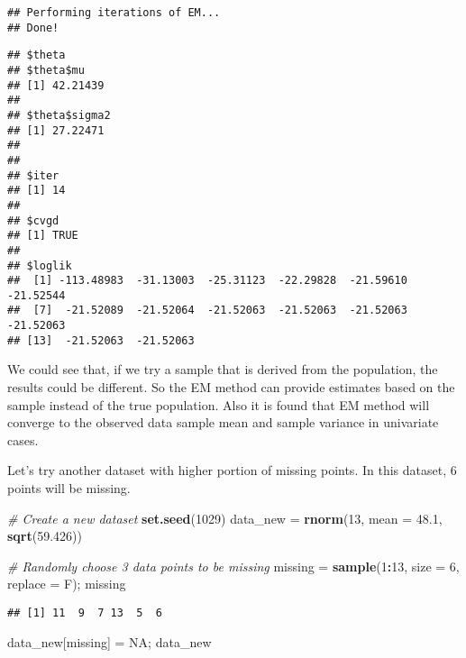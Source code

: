 \documentclass[]{article}
\newenvironment{Shaded}{\begin{snugshade}}{\end{snugshade}}
\newcommand{\CommentTok}[1]{\textcolor[rgb]{0.56,0.35,0.01}{\textit{#1}}}
\newcommand{\DataTypeTok}[1]{\textcolor[rgb]{0.13,0.29,0.53}{#1}}
\newcommand{\DecValTok}[1]{\textcolor[rgb]{0.00,0.00,0.81}{#1}}
\newcommand{\FloatTok}[1]{\textcolor[rgb]{0.00,0.00,0.81}{#1}}
\newcommand{\KeywordTok}[1]{\textcolor[rgb]{0.13,0.29,0.53}{\textbf{#1}}}
\newcommand{\NormalTok}[1]{#1}
\newcommand{\OperatorTok}[1]{\textcolor[rgb]{0.81,0.36,0.00}{\textbf{#1}}}
\newcommand{\OtherTok}[1]{\textcolor[rgb]{0.56,0.35,0.01}{#1}}
\newcommand{\StringTok}[1]{\textcolor[rgb]{0.31,0.60,0.02}{#1}}
\begin{document}
\begin{verbatim}
## Performing iterations of EM... 
## Done!
\end{verbatim}

\begin{verbatim}
## $theta
## $theta$mu
## [1] 42.21439
## 
## $theta$sigma2
## [1] 27.22471
## 
## 
## $iter
## [1] 14
## 
## $cvgd
## [1] TRUE
## 
## $loglik
##  [1] -113.48983  -31.13003  -25.31123  -22.29828  -21.59610  -21.52544
##  [7]  -21.52089  -21.52064  -21.52063  -21.52063  -21.52063  -21.52063
## [13]  -21.52063  -21.52063
\end{verbatim}

We could see that, if we try a sample that is derived from the
population, the results could be different. So the EM method can provide
estimates based on the sample instead of the true population. Also it is
found that EM method will converge to the observed data sample mean and
sample variance in univariate cases.

Let's try another dataset with higher portion of missing points. In this
dataset, 6 points will be missing.

\begin{Shaded}
\begin{Highlighting}[]
\CommentTok{# Create a new dataset}
\KeywordTok{set.seed}\NormalTok{(}\DecValTok{1029}\NormalTok{)}
\NormalTok{data_new =}\StringTok{ }\KeywordTok{rnorm}\NormalTok{(}\DecValTok{13}\NormalTok{, }\DataTypeTok{mean =} \FloatTok{48.1}\NormalTok{, }\KeywordTok{sqrt}\NormalTok{(}\FloatTok{59.426}\NormalTok{))}

\CommentTok{# Randomly choose 3 data points to be missing}
\NormalTok{missing =}\StringTok{ }\KeywordTok{sample}\NormalTok{(}\DecValTok{1}\OperatorTok{:}\DecValTok{13}\NormalTok{, }\DataTypeTok{size =} \DecValTok{6}\NormalTok{, }\DataTypeTok{replace =}\NormalTok{ F); missing}
\end{Highlighting}
\end{Shaded}

\begin{verbatim}
## [1] 11  9  7 13  5  6
\end{verbatim}

\begin{Shaded}
\begin{Highlighting}[]
\NormalTok{data_new[missing] =}\StringTok{ }\OtherTok{NA}\NormalTok{; data_new}
\end{Highlighting}
\end{Shaded}
\end{document}
